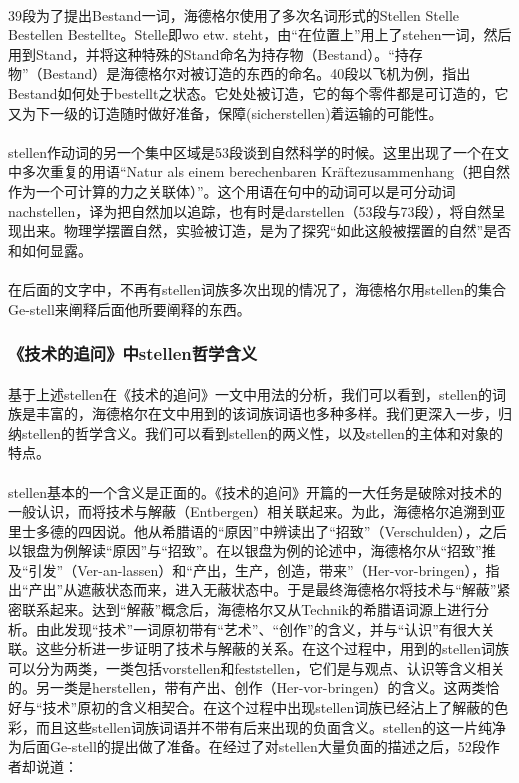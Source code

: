 \documentclass{article}
\begin{document}
			\paragraph{}
		39段为了提出Bestand一词，海德格尔使用了多次名词形式的Stellen Stelle Bestellen Bestellte。Stelle即wo etw. steht\cite{yellow_etym}，由“在位置上”用上了stehen一词，然后用到Stand，并将这种特殊的Stand命名为持存物（Bestand）。“持存物”（Bestand）是海德格尔对被订造的东西的命名。40段以飞机为例，指出Bestand如何处于bestellt之状态。它处处被订造，它的每个零件都是可订造的，它又为下一级的订造随时做好准备，保障(sicherstellen)着运输的可能性。	
			\paragraph{}
		stellen作动词的另一个集中区域是53段谈到自然科学的时候。这里出现了一个在文中多次重复的用语“Natur als einem berechenbaren Kräftezusammenhang（把自然作为一个可计算的力之关联体）”。这个用语在句中的动词可以是可分动词nachstellen，译为把自然加以追踪，也有时是darstellen（53段与73段），将自然呈现出来。物理学摆置自然，实验被订造，是为了探究“如此这般被摆置的自然”是否和如何显露。
			\paragraph{}
		在后面的文字中，不再有stellen词族多次出现的情况了，海德格尔用stellen的集合Ge-stell来阐释后面他所要阐释的东西。
		\subsubsection{《技术的追问》中stellen哲学含义}
			\paragraph{}
			基于上述stellen在《技术的追问》一文中用法的分析，我们可以看到，stellen的词族是丰富的，海德格尔在文中用到的该词族词语也多种多样。我们更深入一步，归纳stellen的哲学含义。我们可以看到stellen的两义性，以及stellen的主体和对象的特点。
			\paragraph{}
			stellen基本的一个含义是正面的。《技术的追问》开篇的一大任务是破除对技术的一般认识，而将技术与解蔽（Entbergen）相关联起来。为此，海德格尔追溯到亚里士多德的四因说。他从希腊语的“原因”中辨读出了“招致”（Verschulden），之后以银盘为例解读“原因”与“招致”。在以银盘为例的论述中，海德格尔从“招致”推及“引发”（Ver-an-lassen）和“产出，生产，创造，带来”（Her-vor-bringen），指出“产出”从遮蔽状态而来，进入无蔽状态中。于是最终海德格尔将技术与“解蔽”紧密联系起来。达到“解蔽”概念后，海德格尔又从Technik的希腊语词源上进行分析。由此发现“技术”一词原初带有“艺术”、“创作”的含义，并与“认识”有很大关联。这些分析进一步证明了技术与解蔽的关系。在这个过程中，用到的stellen词族可以分为两类，一类包括vorstellen和feststellen，它们是与观点、认识等含义相关的。另一类是herstellen，带有产出、创作（Her-vor-bringen）的含义。这两类恰好与“技术”原初的含义相契合。在这个过程中出现stellen词族已经沾上了解蔽的色彩，而且这些stellen词族词语并不带有后来出现的负面含义。stellen的这一片纯净为后面Ge-stell的提出做了准备。在经过了对stellen大量负面的描述之后，52段作者却说道：
\end{document}

